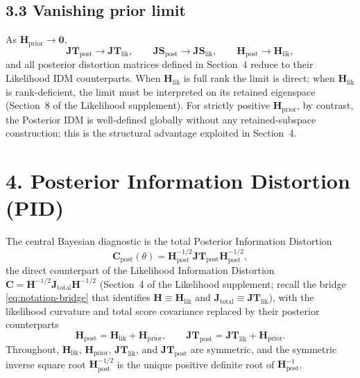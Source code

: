 \documentclass[11pt]{article}
\begin{document}
\subsection*{3.3 Vanishing prior limit}

As $\mathbf H_{\mathrm{prior}} \to \mathbf 0$,
\begin{equation}
\mathbf{JT}_{\mathrm{post}} \to \mathbf{JT}_{\mathrm{lik}},
\qquad
\mathbf{JS}_{\mathrm{post}} \to \mathbf{JS}_{\mathrm{lik}},
\qquad
\mathbf H_{\mathrm{post}} \to \mathbf H_{\mathrm{lik}},
\label{eq:flat-prior-limit}
\end{equation}
and all posterior distortion matrices defined in Section~4 reduce to their Likelihood IDM counterparts. When $\mathbf H_{\mathrm{lik}}$ is full rank the limit is direct; when $\mathbf H_{\mathrm{lik}}$ is rank-deficient, the limit must be interpreted on its retained eigenspace (Section~8 of the Likelihood supplement). For strictly positive $\mathbf H_{\mathrm{prior}}$, by contrast, the Posterior IDM is well-defined globally without any retained-subspace construction; this is the structural advantage exploited in Section~4.

\section*{4. Posterior Information Distortion (PID)}

The central Bayesian diagnostic is the total Posterior Information Distortion
\begin{equation}
\mathbf C_{\mathrm{post}}(\theta)
=
\mathbf H_{\mathrm{post}}^{-1/2}
\mathbf{JT}_{\mathrm{post}}
\mathbf H_{\mathrm{post}}^{-1/2},
\label{eq:posterior-c-def}
\end{equation}
the direct counterpart of the Likelihood Information Distortion
$\mathbf C = \mathbf H^{-1/2} \mathbf J_{\mathrm{total}} \mathbf H^{-1/2}$
(Section~4 of the Likelihood supplement; recall the bridge \eqref{eq:notation-bridge} that identifies $\mathbf H \equiv \mathbf H_{\mathrm{lik}}$ and $\mathbf J_{\mathrm{total}} \equiv \mathbf{JT}_{\mathrm{lik}}$), with the likelihood curvature and total score covariance replaced by their posterior counterparts
\begin{equation}
\mathbf H_{\mathrm{post}} = \mathbf H_{\mathrm{lik}} + \mathbf H_{\mathrm{prior}},
\qquad
\mathbf{JT}_{\mathrm{post}} = \mathbf{JT}_{\mathrm{lik}} + \mathbf H_{\mathrm{prior}}.
\label{eq:posterior-h-j}
\end{equation}
Throughout, $\mathbf H_{\mathrm{lik}}$, $\mathbf H_{\mathrm{prior}}$, $\mathbf{JT}_{\mathrm{lik}}$, and $\mathbf{JT}_{\mathrm{post}}$ are symmetric, and the symmetric inverse square root $\mathbf H_{\mathrm{post}}^{-1/2}$ is the unique positive definite root of $\mathbf H_{\mathrm{post}}^{-1}$.
\end{document}
